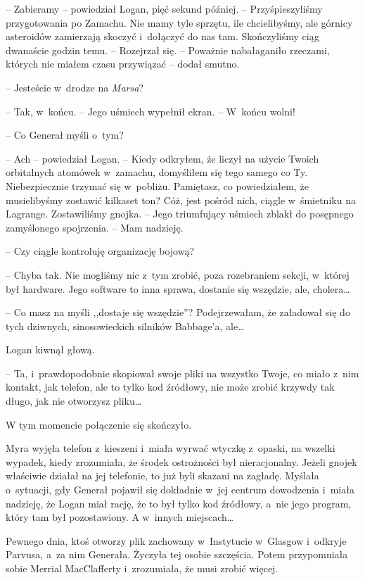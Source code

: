 \documentclass[oneside,polish,11pt,sfheadings]{mwbk}
\begin{document}
-- Zabieramy -- powiedział Logan, pięć sekund później. -- Przyśpieszyliśmy
przygotowania po Zamachu. Nie mamy tyle sprzętu, ile chcielibyśmy, ale
górnicy asteroidów zamierzają skoczyć i~dołączyć do nas tam.
Skończyliśmy ciąg dwanaście godzin temu. -- Rozejrzał się. -- Poważnie
nabałaganiło rzeczami, których nie miałem czasu przywiązać -- dodał
smutno.

-- Jesteście w~drodze na \textit{Marsa}?

-- Tak, w~końcu. -- Jego uśmiech wypełnił ekran. -- W~końcu wolni!

-- Co Generał myśli o~tym?

-- Ach -- powiedział Logan. -- Kiedy odkryłem, że liczył na użycie Twoich
orbitalnych atomówek w~zamachu, domyśliłem się tego samego co Ty.
Niebezpiecznie trzymać się w~pobliżu. Pamiętasz, co powiedziałem, że
musielibyśmy zostawić kilkaset ton? Cóż, jest pośród nich, ciągle w~śmietniku na Lagrange. Zostawiliśmy gnojka. -- Jego triumfujący uśmiech
zblakł do posępnego zamyślonego spojrzenia. -- Mam nadzieję.

-- Czy ciągle kontroluję organizację bojową?

-- Chyba tak. Nie mogliśmy nic z~tym zrobić, poza rozebraniem sekcji, w~której był hardware. Jego software to inna sprawa, dostanie się
wszędzie, ale, cholera\ldots

-- Co masz na myśli ,,dostaje się wszędzie''? Podejrzewałam, że załadował
się do tych dziwnych, sinosowieckich silników Babbage'a, ale\ldots

Logan kiwnął głową. 

-- Ta, i~prawdopodobnie skopiował swoje pliki na
wszystko Twoje, co miało z~nim kontakt, jak telefon, ale to tylko kod
źródłowy, nie może zrobić krzywdy tak długo, jak nie otworzysz pliku\ldots

W tym momencie połączenie się skończyło.

Myra wyjęła telefon z~kieszeni i~miała wyrwać wtyczkę z~opaski, na
wszelki wypadek, kiedy zrozumiała, że środek ostrożności był
nieracjonalny. Jeżeli gnojek właściwie działał na jej telefonie, to już
byli skazani na zagładę. Myślała o~sytuacji, gdy Generał pojawił się
dokładnie w~jej centrum dowodzenia i~miała nadzieję, że Logan miał
rację, że to był tylko kod źródłowy, a~nie jego program, który tam był
pozostawiony. A w~innych miejscach\ldots

Pewnego dnia, ktoś otworzy plik zachowany w~Instytucie w~Glasgow i~odkryje Parvusa, a~za nim Generała. Życzyła tej osobie szczęścia. Potem
przypomniała sobie Merrial MacClafferty i~zrozumiała, że musi zrobić
więcej.
\end{document}
